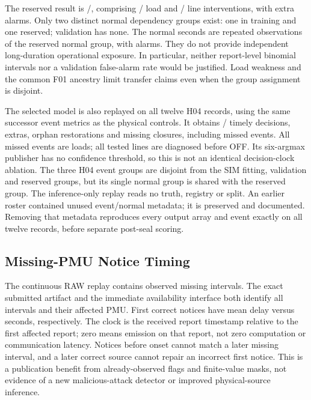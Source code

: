 The reserved result is \MLHoldTimely{}/\MLHoldEvents{}, comprising
\MLHoldLoad{}/\MLHoldLoadTotal{} load and
\MLHoldLine{}/\MLHoldLineTotal{} line interventions, with \MLHoldExtras{}
extra alarms. Only two distinct normal dependency groups exist: one in
training and one reserved; validation has none. The
\MLHoldNormalSeconds{} normal seconds are repeated observations of the
reserved normal group, with \MLHoldNormalAlarms{} alarms. They do not
provide independent long-duration operational exposure. In particular,
neither report-level binomial intervals nor a validation false-alarm rate
would be justified. Load weakness and the common F01 ancestry limit
transfer claims even when the group assignment is disjoint.

The selected model is also replayed on all twelve H04 records, using the
same successor event metrics as the physical controls. It obtains
\ETCommonTimely{}/\ETCommonTotal{} timely decisions, \ETCommonExtras{}
extras, \ETCommonOrphan{} orphan restorations and \ETCommonMissing{}
missing closures, including missed events. All missed events are loads;
all tested lines are diagnosed before OFF. Its six-argmax publisher has no
confidence threshold, so this is not an identical decision-clock ablation.
The three H04 event groups are disjoint from the SIM fitting, validation
and reserved groups, but its single normal group is shared with the
reserved group. The inference-only replay reads no truth, registry or split.
An earlier roster contained unused event/normal metadata; it is preserved
and documented. Removing that metadata reproduces every output array and
event exactly on all twelve records, before separate post-seal scoring.

\subsection{Missing-PMU Notice Timing}
The continuous RAW replay contains \MissingEpisodes{} observed missing
intervals. The exact submitted artifact and the immediate availability
interface both identify all intervals and their affected PMU. First correct
notices have mean delay \MissingLegacyDelay{} versus
\MissingImmediateDelay{} seconds, respectively. The clock is the received
report timestamp relative to the first affected report; zero means emission
on that report, not zero computation or communication latency. Notices
before onset cannot match a later missing interval, and a later correct
source cannot repair an incorrect first notice. This is a publication benefit
from already-observed flags and finite-value masks, not evidence of a new
malicious-attack detector or improved physical-source inference.


